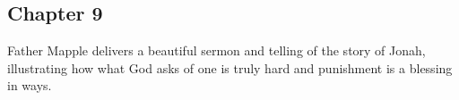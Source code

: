 \subsection{Chapter 9}

Father Mapple delivers a beautiful sermon and telling of the story of Jonah,
illustrating how what God asks of one is truly hard and punishment is a
blessing in ways.
